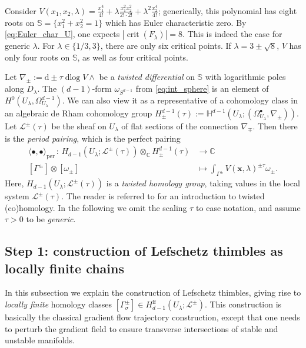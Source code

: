 \documentclass[11pt, a4paper]{article}
\numberwithin{theorem}{section}
\theoremstyle{remark}
\newenvironment{example}
{\pushQED{\qed}\renewcommand{\qedsymbol}{$\diamond$}\examplex}
{\popQED\endexamplex}
\newcommand{\CC}{\mathbb{C}}
\newcommand{\per}{\mathrm{per}}
\DeclareMathOperator{\dlog}{dlog}
\DeclareMathOperator{\crit}{crit}
\renewcommand{\d}{\mathrm{d}}
\renewcommand{\L}{\mathcal{L}}
\newcommand{\bb}[1]{\boldsymbol{#1}}
\newcommand{\lf}{\mathrm{lf}}
\newcommand{\Sc}{\mathbb{S}}
\theoremstyle{theorem}
\begin{document}
\begin{example}
  \label{ex:critical_point_count}
  Consider $V(x_1,x_2,\lambda) = \frac{x_1^4}{4!} + \lambda \frac{x_1^2 x_2^2}{2!\cdot 2!} + \lambda^2 \frac{x_2^4}{4!}$; generically, this polynomial has eight roots on $\Sc = \{x_1^2+x_2^2=1\}$ which has Euler characteristic zero. By \eqref{eq:Euler_char_U}, one expects $|\crit(F_\lambda)| = 8$. This is indeed the case for generic $\lambda$. For $\lambda\in\{1/3,3\}$, there are only six critical points. If $\lambda = 3\pm\sqrt{8}$, $V$ has only four roots on $\Sc$, as well as four critical points.
\end{example}

Let $\nabla_\pm := \d \pm \tau \dlog V \wedge$ be a \emph{twisted differential} on $\Sc$ with logarithmic poles along $D_\lambda$. The $(d-1)$-form $\omega_{S^{d-1}}$ from \eqref{eq:int_sphere} is an element of $H^0(U_\lambda, \Omega^{d-1}_{U_\lambda})$. 
We can also view it as a representative of a cohomology class in an algebraic de Rham cohomology group $H^{d-1}_\pm(\tau) := \mathbb{H}^{d-1}(U_\lambda;(\Omega^\bullet_{U_\lambda},\nabla_\pm))$. Let $\L^{\pm}(\tau)$ be the sheaf on $U_\lambda$ of flat sections of the connection $\nabla_\mp$. Then there is the \emph{period pairing}, which is the perfect pairing
\begin{align}
  \label{eq:period_pairing}
  \langle \bullet,\bullet \rangle_{\per} \,:\, H_{d-1}(U_\lambda;\L^\pm(\tau)) \otimes_\CC H^{d-1}_\pm(\tau) & \rightarrow \CC \\
  [\Gamma^\pm] \otimes [\omega_\pm] & \mapsto \int_{\Gamma^\pm} V(\bb{x},\lambda)^{\pm\tau} \omega_{\pm}. \nonumber
\end{align}
Here, $H_{d-1}(U_\lambda;\L^\pm(\tau))$ is a \emph{twisted homology group}, taking values in the local system $\L^\pm(\tau)$. The reader is referred to \cite[\S 3]{matsubara2023four} for an introduction to twisted (co)homology. 
In the following we omit the scaling $\tau$ to ease notation, and assume $\tau > 0$ to be \emph{generic}.


\subsection{Step 1: construction of Lefschetz thimbles as locally finite chains}

In this subsection we explain the construction of Lefschetz thimbles, giving rise to \emph{locally finite} homology classes $[\Gamma_\sigma^\pm] \in H_{d-1}^\lf(U_\lambda;\L^\pm)$. This construction is basically the classical gradient flow trajectory construction, except that one needs to perturb the gradient field to ensure transverse intersections of stable and unstable manifolds.\par   
\end{document}
